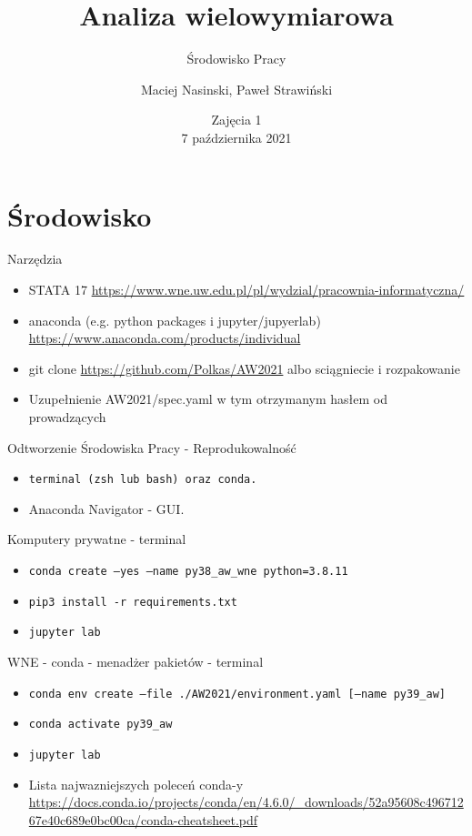 \documentclass{beamer}
\begin{document}
\begin{frame}
\title[Tytuł]{Analiza wielowymiarowa}
\subtitle{Środowisko Pracy}
\author{Maciej Nasinski, Paweł Strawiński}
\date{Zajęcia 1 \\ 7 października 2021}
\titlepage
\end{frame}

\section{Środowisko}

\begin{frame}{Narzędzia}
  \begin{itemize}
  \item STATA 17 \url{https://www.wne.uw.edu.pl/pl/wydzial/pracownia-informatyczna/}
  \item anaconda (e.g. python packages i jupyter/jupyerlab) \url{https://www.anaconda.com/products/individual}
  \item git clone \url{https://github.com/Polkas/AW2021} albo sciągniecie i rozpakowanie
  \item Uzupełnienie AW2021/spec.yaml w tym otrzymanym hasłem od prowadzących
  \end{itemize}
\end{frame}

\begin{frame}{Odtworzenie Środowiska Pracy - Reprodukowalność}
  \begin{itemize}
  \item \texttt{terminal (zsh lub bash) oraz conda.}
  \item Anaconda Navigator - GUI.
  \end{itemize}
\end{frame}

\begin{frame}{Komputery prywatne - terminal}
  \begin{itemize}
  \item \texttt{conda create --yes --name py38\_aw\_wne python=3.8.11} 
  \item \texttt{pip3 install -r requirements.txt}
  \item \texttt{jupyter lab}
  \end{itemize}
\end{frame}

\begin{frame}{WNE - conda - menadżer pakietów - terminal}
\begin{itemize}
  \item \texttt{conda env create --file ./AW2021/environment.yaml [--name py39\_aw]}
  \item \texttt{conda activate py39\_aw}
  \item \texttt{jupyter lab}
  \item Lista najwazniejszych poleceń conda-y \url{https://docs.conda.io/projects/conda/en/4.6.0/_downloads/52a95608c49671267e40c689e0bc00ca/conda-cheatsheet.pdf}
  \end{itemize}
\end{frame}
\end{document}
